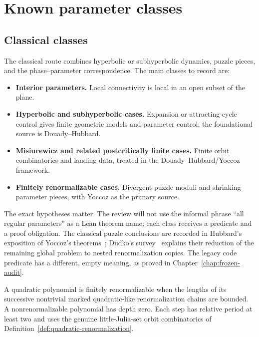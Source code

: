 \chapter{Known parameter classes}
\label{chap:known-classes}

\section{Classical classes}

The classical route combines hyperbolic or subhyperbolic dynamics, puzzle
pieces, and the phase--parameter correspondence.  The main classes to record
are:
\begin{itemize}
\item \textbf{Interior parameters.}  Local connectivity is local in an
      open subset of the plane.
\item \textbf{Hyperbolic and subhyperbolic cases.}  Expansion or
      attracting-cycle control gives finite geometric models and parameter
      control; the foundational source is Douady--Hubbard.
\item \textbf{Misiurewicz and related postcritically finite cases.}
      Finite orbit combinatorics and landing data, treated in the
      Douady--Hubbard/Yoccoz framework.
\item \textbf{Finitely renormalizable cases.}  Divergent puzzle moduli and
      shrinking parameter pieces, with Yoccoz as the primary source.
\end{itemize}

The exact hypotheses matter.  The review will not use the informal phrase
``all regular parameters'' as a Lean theorem name; each class receives a
predicate and a proof obligation.  The classical puzzle conclusions are
recorded in Hubbard's exposition of Yoccoz's
theorems~\cite{HubbardYoccoz}; Dudko's
survey~\cite[Section~2]{DudkoMLC} explains their reduction of the
remaining global problem to nested renormalization copies.
The legacy code predicate  has a different,
empty meaning, as proved in Chapter~\ref{chap:frozen-audit}.

\begin{definition}
A quadratic polynomial is finitely renormalizable when the lengths
of its successive nontrivial marked quadratic-like
renormalization chains are bounded.  A nonrenormalizable polynomial
has depth zero.  Each step has relative period at least two and uses
the genuine little-Julia-set orbit combinatorics of
Definition~\ref{def:quadratic-renormalization}.
\end{definition}

